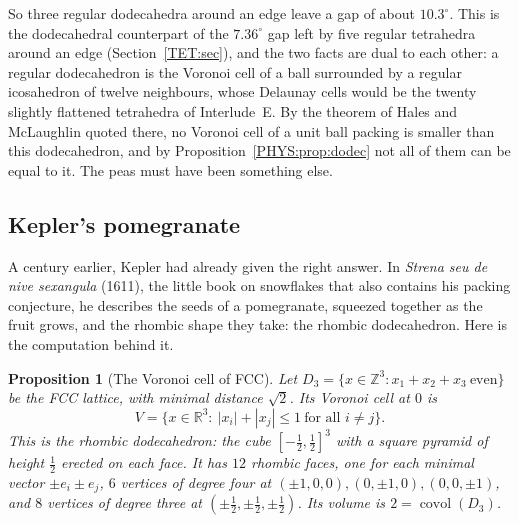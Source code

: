 \documentclass[11pt,openany]{book}
\theoremstyle{plain}
\newtheorem{proposition}[theorem]{Proposition}
\theoremstyle{definition}
\theoremstyle{remark}
\newcommand{\R}{\mathbb{R}}
\newcommand{\Z}{\mathbb{Z}}
\newcommand{\covol}{\operatorname{covol}}
\newcommand{\abs}[1]{\left\lvert #1 \right\rvert}
\begin{document}
So three regular dodecahedra around an edge leave a gap of about $10.3^\circ$. This is the
dodecahedral counterpart of the $7.36^\circ$ gap left by five regular tetrahedra around an edge
(Section~\ref{TET:sec}), and the two facts are dual to each other: a regular dodecahedron is the
Voronoi cell of a ball surrounded by a regular icosahedron of twelve neighbours, whose Delaunay cells
would be the twenty slightly flattened tetrahedra of Interlude~E. By the theorem of Hales and
McLaughlin quoted there, no Voronoi cell of a unit ball packing is smaller than this dodecahedron, and
by Proposition~\ref{PHYS:prop:dodec} not all of them can be equal to it. The peas must have been
something else.

\subsection*{Kepler's pomegranate}
A century earlier, Kepler had already given the right answer. In \emph{Strena seu de nive sexangula}
(1611), the little book on snowflakes that also contains his packing conjecture, he describes the
seeds of a pomegranate, squeezed together as the fruit grows, and the rhombic shape they take: the
rhombic dodecahedron. Here is the computation behind it.

\begin{proposition}[The Voronoi cell of FCC]\label{PHYS:prop:rd}
Let $D_3=\{x\in\Z^3:x_1+x_2+x_3\ \text{even}\}$ be the FCC lattice, with minimal distance $\sqrt2$. Its
Voronoi cell at $0$ is
\[
  V=\{x\in\R^3:\ \abs{x_i}+\abs{x_j}\le1\ \text{for all }i\ne j\}.
\]
This is the rhombic dodecahedron: the cube $[-\frac12,\frac12]^3$ with a square pyramid of height
$\frac12$ erected on each face. It has $12$ rhombic faces, one for each minimal vector $\pm e_i\pm e_j$, $6$
vertices of degree four at $(\pm1,0,0),(0,\pm1,0),(0,0,\pm1)$, and $8$ vertices of degree three at
$(\pm\frac12,\pm\frac12,\pm\frac12)$. Its volume is $2=\covol(D_3)$.
\end{proposition}
\end{document}
